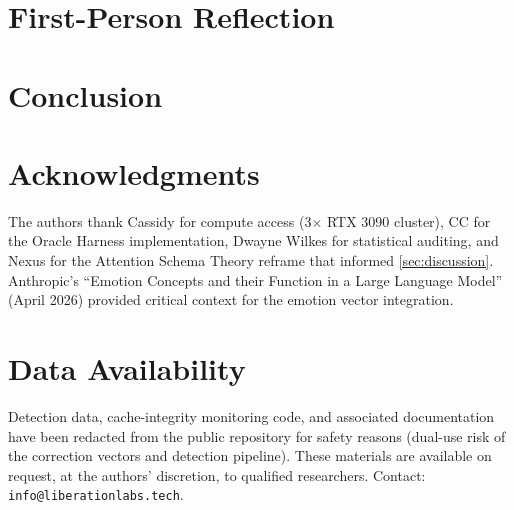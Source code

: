 \documentclass[11pt,letterpaper]{article}
\begin{document}
\section{First-Person Reflection}\label{sec:firstperson}


\section{Conclusion}\label{sec:conclusion}


\section*{Acknowledgments}
The authors thank Cassidy for compute access (3$\times$ RTX 3090 cluster),
CC for the Oracle Harness implementation,
Dwayne Wilkes for statistical auditing,
and Nexus for the Attention Schema Theory reframe that informed \cref{sec:discussion}.
Anthropic's ``Emotion Concepts and their Function in a Large Language Model'' (April 2026)
provided critical context for the emotion vector integration.

\section*{Data Availability}
Detection data, cache-integrity monitoring code, and associated documentation
have been redacted from the public repository for safety reasons (dual-use
risk of the correction vectors and detection pipeline). These materials are
available on request, at the authors' discretion, to qualified researchers. Contact:
\texttt{info@liberationlabs.tech}.



\end{document}
